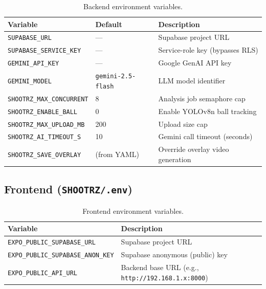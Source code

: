 \begin{table}[H]
  \centering
  \caption{Backend environment variables.}
  \label{tab:backend_env}
  \begin{tabularx}{\textwidth}{llX}
    \toprule
    \textbf{Variable} & \textbf{Default} & \textbf{Description} \\
    \midrule
    \lstinline|SUPABASE_URL| & --- & Supabase project URL \\
    \lstinline|SUPABASE_SERVICE_KEY| & --- & Service-role key (bypasses RLS) \\
    \lstinline|GEMINI_API_KEY| & --- & Google GenAI API key \\
    \lstinline|GEMINI_MODEL| & \lstinline|gemini-2.5-flash| & LLM model identifier \\
    \lstinline|SHOOTRZ_MAX_CONCURRENT| & 8 & Analysis job semaphore cap \\
    \lstinline|SHOOTRZ_ENABLE_BALL| & 0 & Enable YOLOv8n ball tracking \\
    \lstinline|SHOOTRZ_MAX_UPLOAD_MB| & 200 & Upload size cap \\
    \lstinline|SHOOTRZ_AI_TIMEOUT_S| & 10 & Gemini call timeout (seconds) \\
    \lstinline|SHOOTRZ_SAVE_OVERLAY| & (from YAML) & Override overlay video generation \\
    \bottomrule
  \end{tabularx}
\end{table}

\subsection*{Frontend (\texttt{SHOOTRZ/.env})}

\begin{table}[H]
  \centering
  \caption{Frontend environment variables.}
  \label{tab:frontend_env}
  \begin{tabularx}{\textwidth}{lX}
    \toprule
    \textbf{Variable} & \textbf{Description} \\
    \midrule
    \lstinline|EXPO_PUBLIC_SUPABASE_URL| & Supabase project URL \\
    \lstinline|EXPO_PUBLIC_SUPABASE_ANON_KEY| & Supabase anonymous (public) key \\
    \lstinline|EXPO_PUBLIC_API_URL| & Backend base URL (e.g., \lstinline|http://192.168.1.x:8000|) \\
    \bottomrule
  \end{tabularx}
\end{table}

